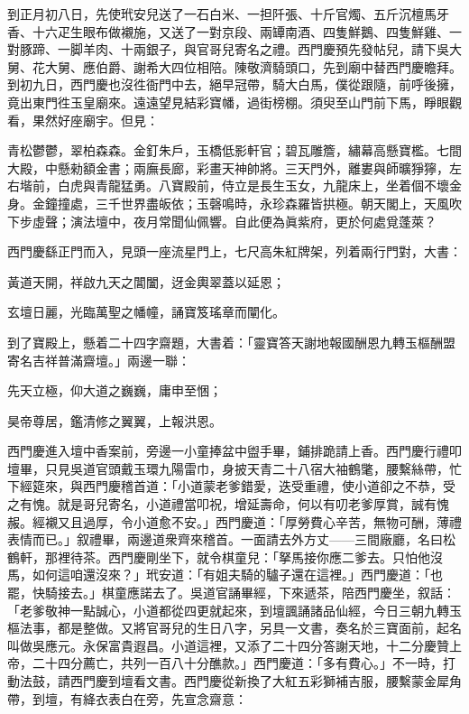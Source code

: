 到正月初八日，先使玳安兒送了一石白米、一担阡張、十斤官燭、五斤沉檀馬牙香、十六疋生眼布做襯施，又送了一對京段、兩罈南酒、四隻鮮鵝、四隻鮮雞、一對豚蹄、一脚羊肉、十兩銀子，與官哥兒寄名之禮。西門慶預先發帖兒，請下吳大舅、花大舅、應伯爵、謝希大四位相陪。陳敬濟騎頭口，先到廟中替西門慶瞻拜。到初九日，西門慶也沒徃衙門中去，絕早冠帶，騎大白馬，僕從跟隨，前呼後擁，竟出東門徃玉皇廟來。遠遠望見結彩寶幡，過街榜棚。須臾至山門前下馬，睜眼觀看，果然好座廟宇。但見：

\begin{myquote}
青松鬱鬱，翠柏森森。金釘朱戶，玉橋低影軒官；碧瓦雕簷，繡幕高懸寶檻。七間大殿，中懸勑額金書；兩廡長廊，彩畫天神帥將。三天門外，離婁與師曠猙獰，左右堦前，白虎與青龍猛勇。八寶殿前，侍立是長生玉女，九龍床上，坐着個不壞金身。金鐘撞處，三千世界盡皈依；玉磬鳴時，永珍森羅皆拱極。朝天閣上，天風吹下步虛聲；演法壇中，夜月常聞仙佩響。自此便為眞紫府，更於何處覓蓬萊？
\end{myquote}

西門慶繇正門而入，見頭一座流星門上，七尺高朱紅牌架，列着兩行門對，大書：

\begin{myquote}
黃道天開，祥啟九天之閶闔，迓金輿翠蓋以延恩；

玄壇日麗，光臨萬聖之幡幢，誦寶笈瑤章而闡化。
\end{myquote}

到了寶殿上，懸着二十四字齋題，大書着：「靈寶答天謝地報國酬恩九轉玉樞酬盟寄名吉祥普滿齋壇。」兩邊一聯：

\begin{myquote}
先天立極，仰大道之巍巍，庸申至悃；

昊帝尊居，鑑清修之翼翼，上報洪恩。
\end{myquote}

西門慶進入壇中香案前，旁邊一小童捧盆中盥手畢，鋪排跪請上香。西門慶行禮叩壇畢，只見吳道官頭戴玉環九陽雷巾，身披天青二十八宿大袖鶴氅，腰繫絲帶，忙下經筵來，與西門慶稽首道：「小道蒙老爹錯愛，迭受重禮，使小道卻之不恭，受之有愧。就是哥兒寄名，小道禮當叩祝，增延壽命，何以有叨老爹厚賞，誠有愧赧。經襯又且過厚，令小道愈不安。」西門慶道：「厚勞費心辛苦，無物可酬，薄禮表情而已。」叙禮畢，兩邊道衆齊來稽首。一面請去外方丈——三間廠廳，名曰松鶴軒，那裡待茶。西門慶剛坐下，就令棋童兒：「拏馬接你應二爹去。只怕他沒馬，如何這咱還沒來？」玳安道：「有姐夫騎的驢子還在這裡。」西門慶道：「也罷，快騎接去。」棋童應諾去了。吳道官誦畢經，下來遞茶，陪西門慶坐，叙話：「老爹敬神一點誠心，小道都從四更就起來，到壇諷誦諸品仙經，今日三朝九轉玉樞法事，都是整做。又將官哥兒的生日八字，另具一文書，奏名於三寶面前，起名叫做吳應元。永保富貴遐昌。小道這裡，又添了二十四分答謝天地，{}十二分慶贊上帝，二十四分薦亡，共列一百八十分醮款。」西門慶道：「多有費心。」不一時，打動法鼓，請西門慶到壇看文書。西門慶從新換了大紅五彩獅補吉服，腰繫蒙金犀角帶，到壇，有絳衣表白在旁，先宣念齋意：

